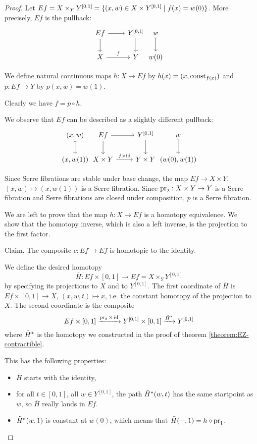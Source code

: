 \begin{proof}
Let $Ef=X\times_Y Y^{[0,1]}=\{(x,w)\in X\times Y^{[0,1]}\mid f(x)=w(0)\}$. More precisely, $Ef$ is the pullback:
\[\begin{tikzcd}
Ef \arrow[d] \arrow[r] & Y^{[0,1]} \arrow[d] &[-6ex] w \ar[d,mapsto] \\
X \arrow[r,"f"] & Y & w(0)
\end{tikzcd}\]

We define natural continuous maps $h:X\to Ef$ by $h(x)=(x,\operatorname{const}_{f(x)})$ and $p:Ef\to Y$ by $p(x,w)=w(1)$.

Clearly we have $f=p\circ h$.

We observe that $Ef$ can be described as a slightly different pullback:
\[\begin{tikzcd}
(x,w) \ar[d,mapsto] &[-6ex] Ef \arrow[d] \arrow[r] & Y^{[0,1]} \arrow[d] &[-6ex] w \ar[d,mapsto]\\
(x,w(1)) & X\times Y \arrow[r,"f\times\id"] & Y\times Y & (w(0),w(1))
\end{tikzcd}\]

Since Serre fibrations are stable under base change, the map $Ef\to X\times Y$, $(x,w)\mapsto(x,w(1))$ is a Serre fibration. Since $\operatorname{pr}_2:X\times Y\to Y$ is a Serre fibration and Serre fibrations are closed under composition, $p$ is a Serre fibration. 

We are left to prove that the map $h:X\to Ef$ is a homotopy equivalence. We show that the homotopy inverse, which is also a left inverse, is the projection to the first factor.

Claim. The composite $c:Ef\to Ef$ is homotopic to the identity.

\begin{claimproof}
We define the desired homotopy
\[\bar H:Ef\times[0,1]\to Ef=X\times_Y Y^{[0,1]}\]
by specifying its projections to $X$ and to $Y^{[0,1]}$. The first coordinate of $\bar H$ is $Ef\times[0,1]\to X$, $(x,w,t)\mapsto x$, i.e. the constant homotopy of the projection to $X$. The second coordinate is the composite
\[Ef\times[0,1]\xrightarrow{\operatorname{pr}_2\times\operatorname{id}} Y^{[0,1]}\times [0,1]\xrightarrow{\tilde H^*} Y^{[0,1]}\]
where $\tilde H^*$ is the homotopy we constructed in the proof of theorem \ref{theorem:EZ-contractible}.

This has the following properties:
\begin{itemize}[label={-}]
    \item $\bar H$ starts with the identity,
    \item for all $t\in [0,1]$, all $w\in Y^{[0,1]}$, the path $\tilde H^*(w,t)$ has the same startpoint as $w$, so $\bar H$ really lands in $Ef$.
    \item $\tilde H^*(w,1)$ is constant at $w(0)$, which means that $\bar H(-,1)=h\circ\operatorname{pr}_1$.
\end{itemize}
\end{claimproof}
\end{proof}

